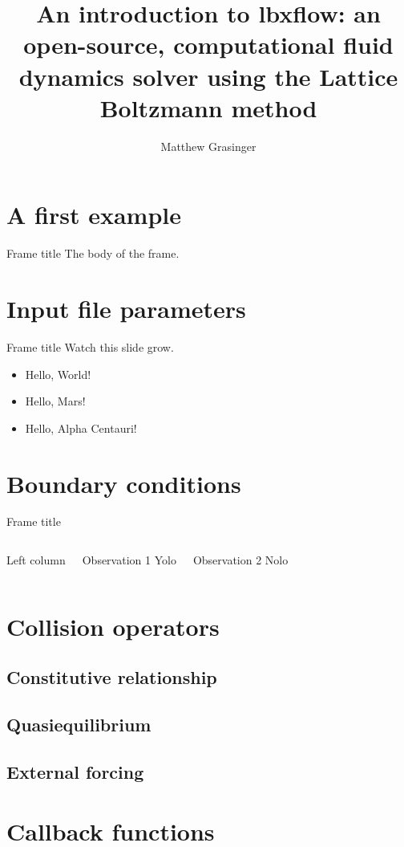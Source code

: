 \documentclass[pdf]{beamer}
\title{An introduction to lbxflow: an open-source, computational fluid dynamics solver using the Lattice Boltzmann method}
\author{Matthew Grasinger}
\begin{document}
\begin{frame}
\titlepage
\end{frame}

\section{A first example}

\begin{frame}{Frame title}
  The body of the frame.
\end{frame}

\section{Input file parameters}

\begin{frame}{Frame title}
  Watch this slide grow.
  \pause
  \begin{itemize}
    \item Hello, World!
      \pause
    \item Hello, Mars!
      \pause
    \item Hello, Alpha Centauri!
  \end{itemize}
\end{frame}

\section{Boundary conditions}

\begin{frame}{Frame title}
  \begin{columns}
    Left column
    \begin{block}{Observation 1}
      Yolo
    \end{block}
    \begin{block}{Observation 2}
      Nolo
    \end{block}
  \end{columns}
\end{frame}

\section{Collision operators}

\subsection{Constitutive relationship}
\subsection{Quasiequilibrium}
\subsection{External forcing}
\section{Callback functions}
\end{document}
